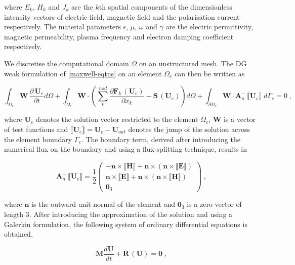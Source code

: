 \documentclass[times,11pt]{ACME2015article}
\newcommand{\mb}{\mathbf}
\begin{document}
where $E_k$, $H_k$ and $J_k$ are the $k$th spatial components of the dimensionless intensity vectors of electric field, magnetic field and the polarisation current respectively. The material parameters $\epsilon$, $\mu$, $\omega$ and $\gamma$ are the electric permittivity, magnetic permeability, plasma frequency and electron damping coefficient respectively.

We discretise the computational domain $\Omega$ on an unstructured mesh. The DG weak formulation \cite{hesthaven2007nodal} of \eqref{maxwell-eqtns} on an element $\Omega_e$ can then be written as

\begin{equation*}
\int_{\Omega_{e}} \mb{W} \, \frac{\partial \, \mb{U}_e }{ \partial t } d \Omega + \int_{\Omega_e} \mb{W} \cdot \left( \sum_k^{nsd} \frac{ \partial \mb{F}_k\,(\mb{U}_e) }{ \partial x_k} - \mb{S}\,(\mb{U}_e) \right) d \Omega + \int_{\partial \Omega_e} \mb{W} \cdot \mb{A}_n^{-} \, \llbracket \mb{U}_e \rrbracket \; d \Gamma_e = 0 \; ,
\end{equation*}

where $\mb{U}_e$ denotes the solution vector restricted to the element $\Omega_e$, $\mb{W}$ is a vector of test functions and $ \llbracket \mb{U}_e \rrbracket = \mb{U}_e - \mb{U}_{out}$ denotes the jump of the solution across the element boundary $\Gamma_e$. The boundary term, derived after introducing the numerical flux on the boundary and using a flux-splitting technique, results in

\begin{equation*}
\mb{A}_n^{-} \, \llbracket \mb{U}_e \rrbracket = \frac{1}{2} \begin{pmatrix} -\mb{n} \times \llbracket \mb{H} \rrbracket + \mb{n} \times ( \mb{n} \times \llbracket \mb{E} \rrbracket ) \\ \mb{n} \times \llbracket \mb{E} \rrbracket + \mb{n} \times ( \mb{n} \times \llbracket \mb{H} \rrbracket ) \\
\mb{0}_{3}
 \end{pmatrix}
 \; ,
\end{equation*}

where $\mb{n}$ is the outward unit normal of the element and $\mb{0}_{3}$ is a zero vector of length 3. After introducing the approximation of the solution and using a Galerkin formulation, the following system of ordinary differential equations is obtained,

\begin{equation*}
\mb{M} \frac{d \boldsymbol{U}}{dt} + \mb{R}\,(\boldsymbol{U}) = \mb{0} \; ,
\end{equation*}
\end{document}
